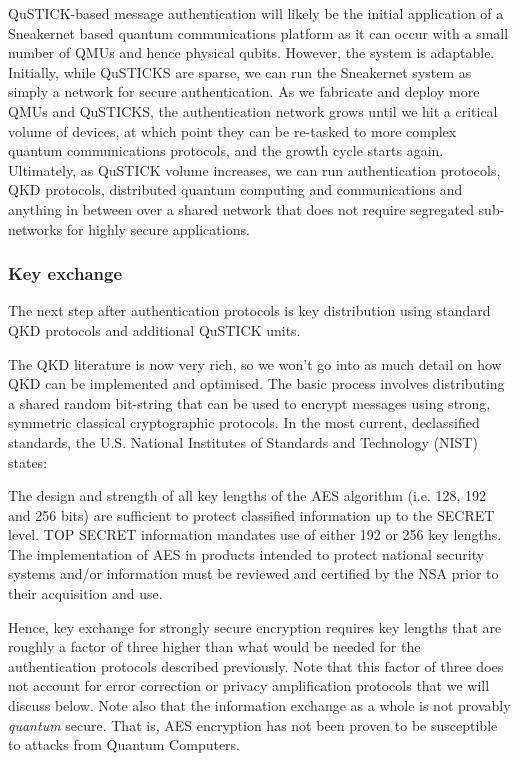 \documentclass[twocolumn, aps, rmp, amsmath, amssymb, nofootinbib, superscriptaddress, longbibliography, floatfix, table-of-contents, eqsecnum]{revtex4-2}
\begin{document}
QuSTICK-based message authentication will likely be the initial application of a Sneakernet based quantum communications platform as it can occur with a small number of QMUs and hence physical qubits. However, the system is adaptable. Initially, while QuSTICKS are sparse, we can run the Sneakernet system as simply a network for secure authentication. As we fabricate and deploy more QMUs and QuSTICKS, the authentication network grows until we hit a critical volume of devices, at which point they can be re-tasked to more complex quantum communications protocols, and the growth cycle starts again. Ultimately, as QuSTICK volume increases, we can run authentication protocols, QKD protocols, distributed quantum computing and communications and anything in between over a shared network that does not require segregated sub-networks for highly secure applications. 

\subsubsection{Key exchange}

The next step after authentication protocols is key distribution using standard QKD protocols and additional QuSTICK units. 

The QKD literature is now very rich, so we won't go into as much detail on how QKD can be implemented and optimised. The basic process involves distributing a shared random bit-string that can be used to encrypt messages using strong, symmetric classical cryptographic protocols. In the most current, declassified standards, the U.S. National Institutes of Standards and Technology (NIST) states:

The design and strength of all key lengths of the AES algorithm (i.e. 128, 192 and 256 bits) are sufficient to protect classified information up to the \textsc{SECRET} level. \textsc{TOP SECRET} information mandates use of either 192 or 256 key lengths. The implementation of AES in products intended to protect national security systems and/or information must be reviewed and certified by the NSA prior to their acquisition and use.

Hence, key exchange for strongly secure encryption requires key lengths that are roughly a factor of three higher than what would be needed for the authentication protocols described previously. Note that this factor of three does not account for error correction or privacy amplification protocols that we will discuss below. Note also that the information exchange as a whole is not provably \textit{quantum} secure. That is, AES encryption has not been proven to be susceptible to attacks from Quantum Computers.
\end{document}
